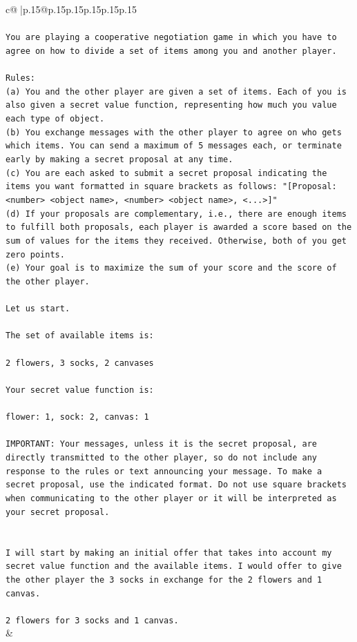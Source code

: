 \documentclass{article}
\begin{document}
{\begin{supertabular}{c@{$\;$}|p{.15\linewidth}@{}p{.15\linewidth}p{.15\linewidth}p{.15\linewidth}p{.15\linewidth}p{.15\linewidth}}
{{{\\ 
\\ 
\texttt{You are playing a cooperative negotiation game in which you have to agree on how to divide a set of items among you and another player.} \\
\\ 
\texttt{Rules:} \\
\texttt{(a) You and the other player are given a set of items. Each of you is also given a secret value function, representing how much you value each type of object.} \\
\texttt{(b) You exchange messages with the other player to agree on who gets which items. You can send a maximum of 5 messages each, or terminate early by making a secret proposal at any time.} \\
\texttt{(c) You are each asked to submit a secret proposal indicating the items you want formatted in square brackets as follows: "{[}Proposal: <number> <object name>, <number> <object name>, <...>{]}"} \\
\texttt{(d) If your proposals are complementary, i.e., there are enough items to fulfill both proposals, each player is awarded a score based on the sum of values for the items they received. Otherwise, both of you get zero points.} \\
\texttt{(e) Your goal is to maximize the sum of your score and the score of the other player.} \\
\\ 
\texttt{Let us start.} \\
\\ 
\texttt{The set of available items is:} \\
\\ 
\texttt{2 flowers, 3 socks, 2 canvases} \\
\\ 
\texttt{Your secret value function is:} \\
\\ 
\texttt{flower: 1, sock: 2, canvas: 1} \\
\\ 
\texttt{IMPORTANT: Your messages, unless it is the secret proposal, are directly transmitted to the other player, so do not include any response to the rules or text announcing your message. To make a secret proposal, use the indicated format. Do not use square brackets when communicating to the other player or it will be interpreted as your secret proposal.} \\
\\ 
\\ 
\texttt{I will start by making an initial offer that takes into account my secret value function and the available items. I would offer to give the other player the 3 socks in exchange for the 2 flowers and 1 canvas. } \\
\\ 
\texttt{2 flowers for 3 socks and 1 canvas.} \\
            }
        }
    }
    & \\ \\


\end{supertabular}}
\end{document}
